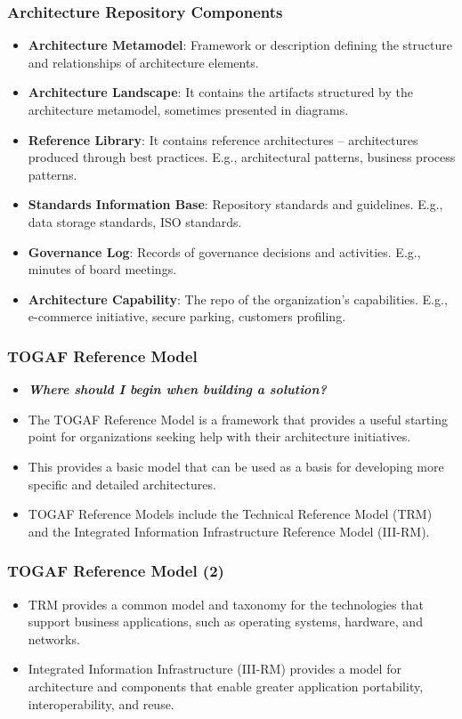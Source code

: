 \documentclass[aspectratio=169, table]{beamer}
\begin{document}
	\begin{frame}
		\frametitle{Architecture Repository Components}
		\vspace{20pt}
		\begin{itemize}
			\item \textbf{Architecture Metamodel}: Framework or description defining the structure and relationships of architecture elements. 
			\item \textbf{Architecture Landscape}: It contains the artifacts structured by the architecture metamodel, sometimes presented in diagrams.			
			\item \textbf{Reference Library}: It contains reference architectures -- architectures produced through best practices. E.g., architectural patterns, business process patterns.
			\item \textbf{Standards Information Base}: Repository standards and guidelines. E.g., data storage standards, ISO standards.
			\item \textbf{Governance Log}: Records of governance decisions and activities. E.g., minutes of board meetings.
			\item \textbf{Architecture Capability}: The repo of the organization’s capabilities. E.g., e-commerce initiative, secure parking, customers profiling. 
		\end{itemize}
	\end{frame}
	
	\begin{frame}
		\frametitle{TOGAF Reference Model}
		\begin{itemize}
			\item \textbf{\textit{Where should I begin when building a solution?}}
			\item The TOGAF Reference Model is a framework that provides a useful starting point for organizations seeking help with their architecture initiatives.
			\item This provides a basic model that can be used as a basis for developing more specific and detailed architectures.
			\item TOGAF Reference Models include the Technical Reference Model (TRM) and the Integrated Information Infrastructure Reference Model (III-RM).
			
		\end{itemize}
	\end{frame}
	
	\begin{frame}
		\frametitle{TOGAF Reference Model (2)}
		\begin{itemize}
			\item TRM provides a common model and taxonomy for the technologies that support business applications, such as operating systems, hardware, and networks.
			\item Integrated Information Infrastructure (III-RM) provides a model for architecture and components that enable greater application portability, interoperability, and reuse.
		\end{itemize}
	\end{frame}
	
\end{document}
